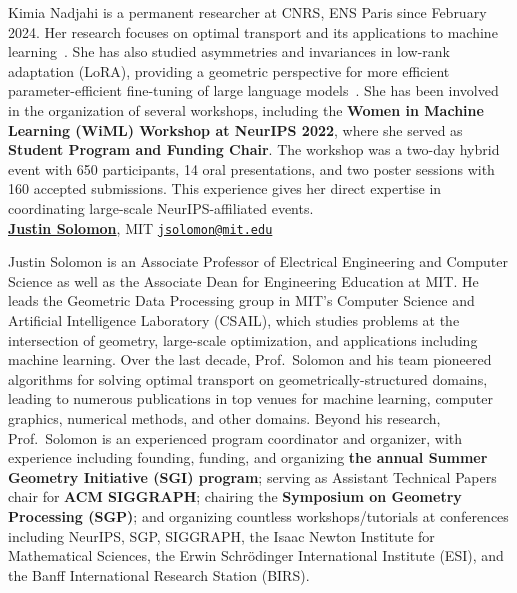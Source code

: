 \documentclass{article}
\begin{document}
Kimia Nadjahi is a permanent researcher at CNRS, ENS Paris since February 2024. Her research focuses on optimal transport and its applications to machine learning~\cite{boite2026expectedbatchoptimaltransport,thurin2025optimal,thurin2026convergenceratesdistributionmatching,kolouri2019generalized}. She has also studied asymmetries and invariances in low-rank adaptation (LoRA), providing a geometric perspective for more efficient parameter-efficient fine-tuning of large language models~\cite{zhu2024asymmetry,castin2026balanced}. She has been involved in the organization of several workshops, including the \textbf{Women in Machine Learning (WiML) Workshop at NeurIPS 2022}, where she served as \textbf{Student Program and Funding Chair}. The workshop was a two-day hybrid event with 650 participants, 14 oral presentations, and two poster sessions with 160 accepted submissions. This experience gives her direct expertise in coordinating large-scale NeurIPS-affiliated events. \\ %


\href{https://people.csail.mit.edu/jsolomon/}{\textbf{Justin Solomon}}, MIT \hfill \href{mailto:jsolomon@mit.edu}{\texttt{jsolomon@mit.edu}}

Justin Solomon is an Associate Professor of Electrical Engineering and Computer Science as well as the Associate Dean for Engineering Education at MIT.  He leads the Geometric Data Processing group in MIT's Computer Science and Artificial Intelligence Laboratory (CSAIL), which studies problems at the intersection of geometry, large-scale optimization, and applications including machine learning.  Over the last decade, Prof.\ Solomon and his team pioneered algorithms for solving optimal transport on geometrically-structured domains, leading to numerous publications in top venues for machine learning, computer graphics, numerical methods, and other domains.  Beyond his research, Prof.\ Solomon is an experienced program coordinator and organizer, with experience including founding, funding, and organizing \textbf{the annual Summer Geometry Initiative (SGI) program}; serving as Assistant Technical Papers chair for \textbf{ACM SIGGRAPH}; chairing the \textbf{Symposium on Geometry Processing (SGP)}; and organizing countless workshops/tutorials at conferences including NeurIPS, SGP, SIGGRAPH, the Isaac Newton Institute for Mathematical Sciences, the Erwin Schr\"odinger International Institute (ESI), and the Banff International Research Station (BIRS).
\end{document}
